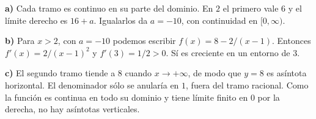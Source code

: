 \textbf{a)} Cada tramo es continuo en su parte del dominio.
En $2$ el primero vale 6 y el límite derecho es $16+a$.
Igualarlos da $\boxed{a=-10}$, con continuidad en $[0,\infty)$.

\textbf{b)} Para $x>2$, con $a=-10$ podemos escribir
$f(x)=8-2/(x-1)$. Entonces $f'(x)=2/(x-1)^2$
y $f'(3)=1/2>0$. Sí es creciente en un entorno de 3.

\textbf{c)} El segundo tramo tiende a 8 cuando $x\to+\infty$,
de modo que $\boxed{y=8}$ es asíntota horizontal.
El denominador sólo se anularía en $1$, fuera del tramo racional.
Como la función es continua en todo su dominio y tiene límite
finito en $0$ por la derecha, no hay asíntotas verticales.
